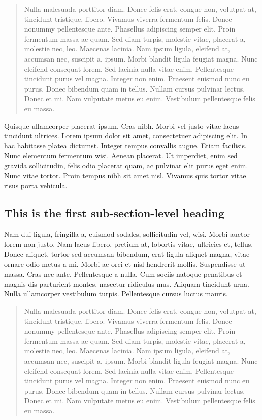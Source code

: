 \documentclass[letterpaper,             %
               oneside,                 %
               \pointsize]              %
               {memoir}
\begin{document}
\begin{quote}
Nulla malesuada porttitor diam. Donec felis erat, congue non, volutpat
at, tincidunt tristique, libero. Vivamus viverra fermentum felis. Donec
nonummy pellentesque ante. Phasellus adipiscing semper elit. Proin
fermentum massa ac quam. Sed diam turpis, molestie vitae, placerat a,
molestie nec, leo. Maecenas lacinia. Nam ipsum ligula, eleifend at,
accumsan nec, suscipit a, ipsum. Morbi blandit ligula feugiat magna.
Nunc eleifend consequat lorem. Sed lacinia nulla vitae enim.
Pellentesque tincidunt purus vel magna. Integer non enim. Praesent
euismod nunc eu purus. Donec bibendum quam in tellus. Nullam cursus
pulvinar lectus. Donec et mi. Nam vulputate metus eu enim. Vestibulum
pellentesque felis eu massa.
\end{quote}

Quisque ullamcorper placerat ipsum. Cras nibh. Morbi vel justo vitae
lacus tincidunt ultrices. Lorem ipsum dolor sit amet, consectetuer
adipiscing elit. In hac habitasse platea dictumst. Integer tempus
convallis augue. Etiam facilisis. Nunc elementum fermentum wisi. Aenean
placerat. Ut imperdiet, enim sed gravida sollicitudin, felis odio
placerat quam, ac pulvinar elit purus eget enim. Nunc vitae tortor.
Proin tempus nibh sit amet nisl. Vivamus quis tortor vitae risus porta
vehicula.

\hypertarget{this-is-the-first-sub-section-level-heading}{%
\subsection{This is the first sub-section-level
heading}\label{this-is-the-first-sub-section-level-heading}}

Nam dui ligula, fringilla a, euismod sodales, sollicitudin vel, wisi.
Morbi auctor lorem non justo. Nam lacus libero, pretium at, lobortis
vitae, ultricies et, tellus. Donec aliquet, tortor sed accumsan
bibendum, erat ligula aliquet magna, vitae ornare odio metus a mi. Morbi
ac orci et nisl hendrerit mollis. Suspendisse ut massa. Cras nec ante.
Pellentesque a nulla. Cum sociis natoque penatibus et magnis dis
parturient montes, nascetur ridiculus mus. Aliquam tincidunt urna. Nulla
ullamcorper vestibulum turpis. Pellentesque cursus luctus mauris.

\begin{quote}
Nulla malesuada porttitor diam. Donec felis erat, congue non, volutpat
at, tincidunt tristique, libero. Vivamus viverra fermentum felis. Donec
nonummy pellentesque ante. Phasellus adipiscing semper elit. Proin
fermentum massa ac quam. Sed diam turpis, molestie vitae, placerat a,
molestie nec, leo. Maecenas lacinia. Nam ipsum ligula, eleifend at,
accumsan nec, suscipit a, ipsum. Morbi blandit ligula feugiat magna.
Nunc eleifend consequat lorem. Sed lacinia nulla vitae enim.
Pellentesque tincidunt purus vel magna. Integer non enim. Praesent
euismod nunc eu purus. Donec bibendum quam in tellus. Nullam cursus
pulvinar lectus. Donec et mi. Nam vulputate metus eu enim. Vestibulum
pellentesque felis eu massa.
\end{quote}
\end{document}
